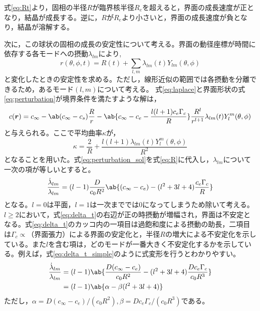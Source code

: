 \documentclass[autodetect-engine,dvi=dvipdfmx,a4paper,ja=standard,oneside,openany,11pt]{bxjsbook}
\begin{document}
式\eqref{eq:Rt}より，固相の半径$R$が臨界核半径$R_e$を超えると，界面の成長速度が正となり，結晶が成長する。逆に，$R$が$R_e$より小さいと，界面の成長速度が負となり，結晶が溶解する。

次に，この球状の固相の成長の安定性について考える。界面の動径座標が時間に依存する各モードへの摂動$\lambda_{lm}$により,
\begin{equation}
  r(\theta,\phi,t) = R(t) + \sum_{l,m} \lambda_{lm}(t)Y_{lm}(\theta,\phi)
  \label{eq:perturbation}
\end{equation}
と変化したときの安定性を求める。ただし，線形近似の範囲では各摂動を分離できるため，あるモード$(l,m)$について考える。
式\eqref{eq:laplace}と界面形状の式\eqref{eq:perturbation}が境界条件を満たすような解は，
\begin{equation}
  \begin{split}
    c(\bm{r})=c_{\infty}-\ab(c_{\infty}-c_s)\frac{R}{r}-\ab\{c_\infty-c_e-\frac{l(l+1)c_e\Gamma_c}{R}\}\frac{R^l}{r^{l+1}}\lambda_{lm}(t)Y_{l}^{m}(\theta,\phi)
  \end{split}
  \label{eq:perturbation_sol}
\end{equation}
と与えられる。ここで平均曲率$\kappa$が，
\begin{equation}
  \kappa = \frac{2}{R}+\frac{l(l+1)\lambda_{lm}(t)Y_l^m(\theta,\phi)}{R^2}
  \label{eq:perturbation_curvature}
\end{equation}
となることを用いた。式\eqref{eq:perturbation_sol}を式\eqref{eq:R}に代入し，$\lambda_{lm}$について一次の項が等しいとすると。
\begin{equation}
  \frac{\dot{\lambda}_{lm}}{\lambda_{lm}} =(l-1)\frac{D}{c_0R^2}\ab\{(c_\infty-c_e)-(l^2+3l+4)\frac{c_e\Gamma_c}{R}\}
  \label{eq:delta_t}
\end{equation}
となる。$l=0$は平面，$l=1$は一次まででは0になってしまうため除いて考える。$l\geq2$において，式\eqref{eq:delta_t}の右辺が正の時摂動が増幅され，界面は不安定となる。式\eqref{eq:delta_t}のカッコ内の一項目は過飽和度による摂動の助長，二項目は$\Gamma_c\propto$（界面張力）による界面の安定化と，半径$R$の増大による不安定化を示している。また$l$を含む項は，どのモードが一番大きく不安定化するかを示している。例えば，式\eqref{eq:delta_t_simple}のように式変形を行うとわかりやすい。
\begin{equation}
  \begin{split}
    \frac{\dot{\lambda}_{lm}}{\lambda_{lm}} & =(l-1)\ab\{\frac{D(c_\infty-c_e)}{c_0R^2}-(l^2+3l+4)\frac{D c_e\Gamma_c}{c_0 R^3}\} \\
                                            & =(l-1)\ab\{\alpha-\beta(l^2+3l+4)\}
  \end{split}
  \label{eq:delta_t_simple}
\end{equation}
ただし，$\alpha=D(c_\infty-c_e)/(c_0R^2),\beta=D c_e\Gamma_c/(c_0 R^3)$である。
\end{document}
